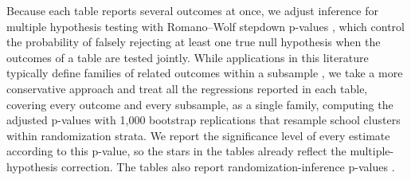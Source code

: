 Because each table reports several outcomes at once, we adjust inference for multiple hypothesis testing with Romano--Wolf stepdown p-values \citep{romano2005stepwise, clarke2020romano}, which control the probability of falsely rejecting at least one true null hypothesis when the outcomes of a table are tested jointly. While applications in this literature typically define families of related outcomes within a subsample \citep{frisancho2023school}, we take a more conservative approach and treat all the regressions reported in each table, covering every outcome and every subsample, as a single family, computing the adjusted p-values with 1,000 bootstrap replications that resample school clusters within randomization strata. We report the significance level of every estimate according to this p-value, so the stars in the tables already reflect the multiple-hypothesis correction. The tables also report randomization-inference p-values \citep{young2019channeling}. 


